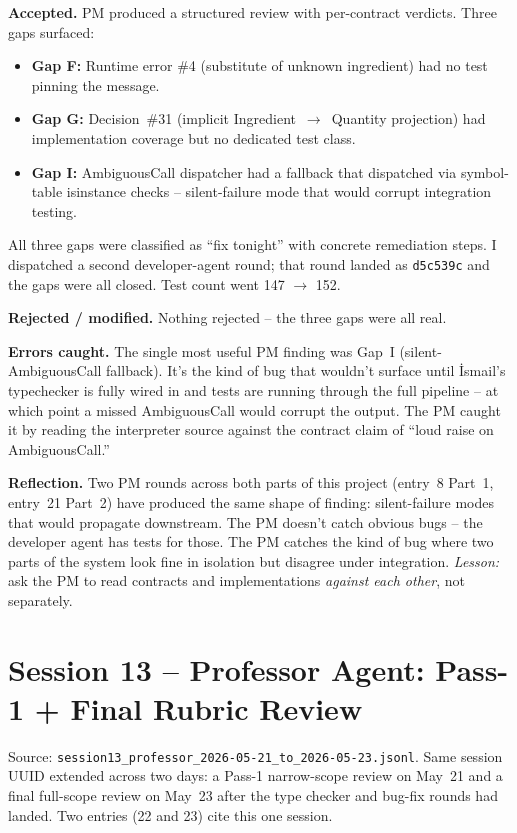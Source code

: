 \documentclass[11pt,a4paper]{article}
\newcommand{\field}[1]{\noindent\textbf{#1}}
\begin{document}
\field{Accepted.} PM produced a structured review with per-contract
verdicts. Three gaps surfaced:

\begin{itemize}[leftmargin=*,itemsep=2pt]
  \item \textbf{Gap F:} Runtime error \#4 (substitute of unknown
        ingredient) had no test pinning the message.
  \item \textbf{Gap G:} Decision~\#31 (implicit Ingredient~$\to$~Quantity
        projection) had implementation coverage but no dedicated test
        class.
  \item \textbf{Gap I:} AmbiguousCall dispatcher had a fallback that
        dispatched via symbol-table isinstance checks -- silent-failure
        mode that would corrupt integration testing.
\end{itemize}

All three gaps were classified as ``fix tonight'' with concrete
remediation steps. I dispatched a second developer-agent round; that
round landed as \texttt{d5c539c} and the gaps were all closed. Test
count went 147 $\to$ 152.

\field{Rejected / modified.} Nothing rejected -- the three gaps were
all real.

\field{Errors caught.} The single most useful PM finding was Gap~I
(silent-AmbiguousCall fallback). It's the kind of bug that wouldn't
surface until İsmail's typechecker is fully wired in and tests are
running through the full pipeline -- at which point a missed
AmbiguousCall would corrupt the output. The PM caught it by reading
the interpreter source against the contract claim of ``loud raise on
AmbiguousCall.''

\field{Reflection.} Two PM rounds across both parts of this project
(entry~8 Part~1, entry~21 Part~2) have produced the same shape of
finding: silent-failure modes that would propagate downstream. The PM
doesn't catch obvious bugs -- the developer agent has tests for
those. The PM catches the kind of bug where two parts of the system
look fine in isolation but disagree under integration. \emph{Lesson:}
ask the PM to read contracts and implementations \emph{against each
other}, not separately.


\section{Session 13 -- Professor Agent: Pass-1 + Final Rubric Review}

Source: \texttt{session13\_professor\_2026-05-21\_to\_2026-05-23.jsonl}.
Same session UUID extended across two days: a Pass-1 narrow-scope review
on May~21 and a final full-scope review on May~23 after the type
checker and bug-fix rounds had landed. Two entries (22 and 23) cite
this one session.
\end{document}
